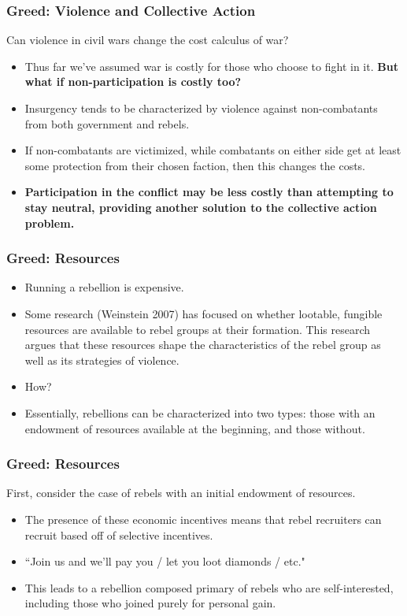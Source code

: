 \documentclass[handout]{beamer}
\begin{document}
\begin{frame} 
	\frametitle{\LARGE{Greed: Violence and Collective Action}}
	Can violence in civil wars change the cost calculus of war?
	\begin{itemize}
		\item Thus far we've assumed war is costly for those who choose to fight in it. \textbf{But what if non-participation is costly too?} \pause
		\item Insurgency tends to be characterized by violence against non-combatants from both government and rebels. 
		\item If non-combatants are victimized, while combatants on either side get at least some protection from their chosen faction, then this changes the costs.
		\item \textbf{Participation in the conflict may be less costly than attempting to stay neutral, providing another solution to the collective action problem.}
	\end{itemize}
\end{frame}

\begin{frame} 
	\frametitle{\LARGE{Greed: Resources}}
	\begin{itemize}
		\item Running a rebellion is expensive. \pause
		\item Some research (Weinstein 2007) has focused on whether lootable, fungible resources are available to rebel groups at their formation. This research argues that these resources shape the characteristics of the rebel group as well as its strategies of violence. \pause
		\item How? 
		\item Essentially, rebellions can be characterized into two types: those with an endowment of resources available at the beginning, and those without. 
	\end{itemize}
\end{frame}

\begin{frame} 
	\frametitle{\LARGE{Greed: Resources}}
First, consider the case of rebels with an initial endowment of resources.
	\begin{itemize}
		\item The presence of these economic incentives means that rebel recruiters can recruit based off of selective incentives. \pause
		\item ``Join us and we'll pay you / let you loot diamonds / etc."
		\item This leads to a rebellion composed primary of rebels who are self-interested, including those who joined purely for personal gain.
	\end{itemize}
\end{frame}
\end{document}
